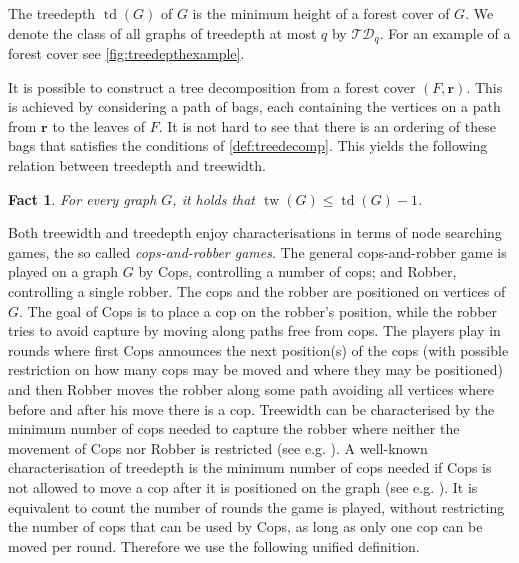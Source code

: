 \documentclass[a4paper,UKenglish,cleveref, autoref, thm-restate]{lipics-v2021}
\newcommand{\TD}{\ensuremath{\mathcal{TD}}}
\newcommand{\tup}[1]{\ensuremath{\boldsymbol{#1}}}
\DeclareMathOperator{\tw}{tw}
\DeclareMathOperator{\td}{td}
\newtheorem{fact}[definition]{Fact}
\begin{document}
The treedepth $\td(G)$ of $G$ is the minimum height of a forest cover of $G$. We denote the class of all graphs of treedepth at most $q$ by $\TD_q$. For an example of a forest cover see \cref{fig:treedepthexample}.

It is possible to construct a tree decomposition from a forest cover $(F, \tup{r})$. This is achieved by considering a path of bags, each containing the vertices on a path from $\tup{r}$ to the leaves of $F$. It is not hard to see that there is an ordering of these bags that satisfies the conditions of \cref{def:treedecomp}.
This yields the following relation between treedepth and treewidth.

\begin{fact}
  For every graph $G$, it holds that $\tw(G) \leq \td(G) - 1$.
\end{fact}

Both treewidth and treedepth enjoy characterisations in terms of node searching games, the so called \emph{cops-and-robber games}.
The general cops-and-robber game is played on a graph $G$ by Cops, controlling a number of cops; and Robber, controlling a single robber.
The cops and the robber are positioned on vertices of $G$.
The goal of Cops is to place a cop on the robber's position, while the robber tries to avoid capture by moving along paths free from cops.
The players play in rounds where first Cops announces the next position(s) of the cops (with possible restriction on how many cops may be moved and where they may be positioned) and then Robber moves the robber along some path avoiding all vertices where before and after his move there is a cop.
Treewidth can be characterised by the minimum number of cops needed to capture the robber where neither the movement of Cops nor Robber is restricted (see e.g. \cite{seymour_graph_1993}).
A well-known characterisation of treedepth is the minimum number of cops needed if Cops is not allowed to move a cop after it is positioned on the graph (see e.g. \cite{giannopoulou_lifo-search_2012}).
It is equivalent to count the number of rounds the game is played, without restricting the number of cops that can be used by Cops, as long as only one cop can be moved per round.
Therefore we use the following unified definition.
\end{document}
